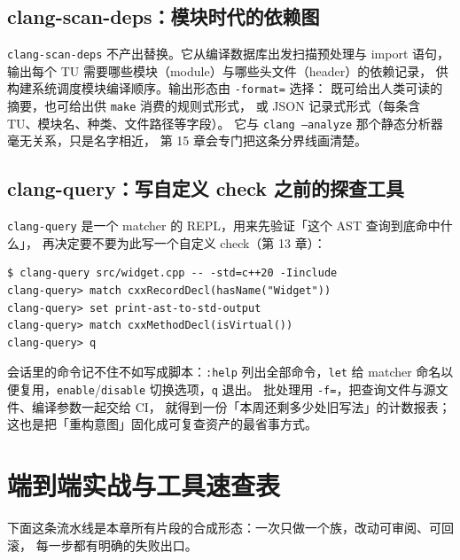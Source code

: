\documentclass[12pt,a4paper,fontset=fandol]{ctexbook}
\newcommand{\Bk}{\discretionary{}{}{}}
\begin{document}
\subsection*{clang-scan-deps：模块时代的依赖图}

\texttt{clang-scan-deps} 不产出替换。它从编译数据库出发扫描预处理与 import 语句，
输出每个 TU 需要哪些模块（module）与哪些头文件（header）的依赖记录，
供构建系统调度模块编译顺序。输出形态由 \texttt{-format=} 选择：
既可给出人类可读的摘要，也可给出供 \texttt{make} 消费的规则式形式，
或 JSON 记录式形式（每条含 TU、模块名、种类、文件路径等字段）。
它与 \texttt{clang --analyze} 那个静态分析器毫无关系，只是名字相近，
第 15 章会专门把这条分界线画清楚。

\subsection*{clang-query：写自定义 check 之前的探查工具}

\texttt{clang-query} 是一个 matcher 的 REPL，用来先验证「这个 AST 查询到底命中什么」，
再决定要不要为此写一个自定义 check（第 13 章）：

\begin{lstlisting}[style=shellstyle,caption={clang-query 交互会话},label={lst:ch14-query}]
$ clang-query src/widget.cpp -- -std=c++20 -Iinclude
clang-query> match cxxRecordDecl(hasName("Widget"))
clang-query> set print-ast-to-std-output
clang-query> match cxxMethodDecl(isVirtual())
clang-query> q
\end{lstlisting}

会话里的命令记不住不如写成脚本：\texttt{:help} 列出全部命令，\texttt{let}
给 matcher 命名以便复用，\texttt{enable}/{\Bk}\texttt{disable} 切换选项，\texttt{q} 退出。
批处理用 \texttt{-f=}，把查询文件与源文件、编译参数一起交给 CI，
就得到一份「本周还剩多少处旧写法」的计数报表；这也是把「重构意图」固化成可复查资产的最省事方式。

\section{端到端实战与工具速查表}\label{sec:ch14-s6}

下面这条流水线是本章所有片段的合成形态：一次只做一个族，改动可审阅、可回滚，
每一步都有明确的失败出口。
\end{document}
